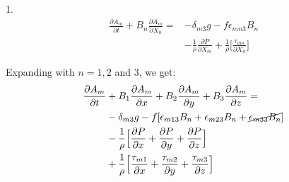 \documentclass[fleqn,10pt]{SelfArx} %
\begin{document}
1. \vspace{-17pt}
\begin{align*}
	\frac{\partial A_m}{\partial t} + B_n\frac{\partial A_m}{\partial X_n} = & -\delta_{m3}g - f\epsilon_{mn3}B_n \\ & -\frac{1}{\rho}\frac{\partial P}{\partial X_m} + \frac{1}{\rho}\Big[\frac{\tau_{mn}}{\partial X_n}\Big]
\end{align*}

Expanding with $n=1,2$ and $3$, we get:
\begin{align*}
	\frac{\partial A_m}{\partial t} & + B_1\frac{\partial A_m}{\partial x} + B_2\frac{\partial A_m}{\partial y} + B_3\frac{\partial A_m}{\partial z} = \\  & -\delta_{m3}g - f[\epsilon_{m13}B_n + \epsilon_{m23}B_n + \cancel{\epsilon_{m33}B_n}] \\ & -\frac{1}{\rho}\Big[\frac{\partial P}{\partial x} + \frac{\partial P}{\partial y} + \frac{\partial P}{\partial z}\Big] \\ & + \frac{1}{\rho}\Big[\frac{\tau_{m1}}{\partial x} + \frac{\tau_{m2}}{\partial y} + \frac{\tau_{m3}}{\partial z}\Big]
\end{align*}
\end{document}

